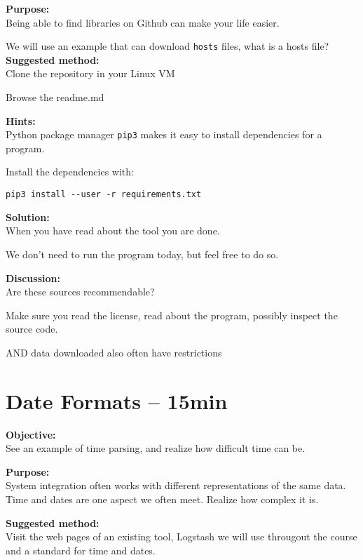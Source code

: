\documentclass[a4paper,11pt,notitlepage]{report}
\begin{document}

{\bf Purpose:}\\
Being able to find libraries on Github can make your life easier.

We will use an example that can download \verb+hosts+ files, what is a hosts file?
{\bf Suggested method:}\\
Clone the repository in your Linux VM

Browse the readme.md

{\bf Hints:}\\
Python package manager \verb+pip3+ makes it easy to install dependencies for a program.

Install the dependencies with:

\begin{verbatim}
pip3 install --user -r requirements.txt
\end{verbatim}


{\bf Solution:}\\
When you have read about the tool you are done.

We don't need to run the program today, but feel free to do so.

{\bf Discussion:}\\
Are these sources recommendable?

Make sure you read the license, read about the program, possibly inspect the source code.

AND data downloaded also often have restrictions


\chapter{Date Formats -- 15min}
\label{ex:dateformats}


{\bf Objective:}\\
See an example of time parsing, and realize how difficult time can be.

{\bf Purpose:}\\
System integration often works with different representations of the same data. Time and dates are one aspect we often meet. Realize how complex it is.

{\bf Suggested method:}\\
Visit the web pages of an existing tool, Logstash we will use througout the course and a standard for time and dates.
\end{document}
